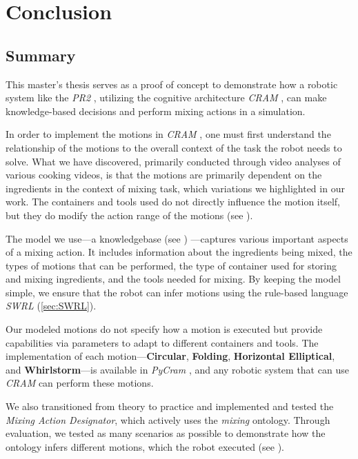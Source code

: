 \chapter{Conclusion}
\label{chap:conclusion}

\section{Summary}
This master's thesis serves as a proof of concept to demonstrate how a robotic system like the \textit{PR2} \cite{pr2}, utilizing the cognitive architecture \textit{CRAM} \cite{beetz10cram}, can make knowledge-based decisions and perform mixing actions in a simulation.

In order to implement the motions in \textit{CRAM} \cite{beetz10cram}, one must first understand the relationship of the motions to the overall context of the task the robot needs to solve. What we have discovered, primarily conducted through video analyses of various cooking videos, is that the motions are primarily dependent on the ingredients in the context of mixing task, which variations we highlighted in our work. The containers and tools used do not directly influence the motion itself, but they do modify the action range of the motions
(see ).

The model we use—a knowledgebase (see ) —captures various important aspects of a mixing action. It includes information about the ingredients being mixed, the types of motions that can be performed, the type of container used for storing and mixing ingredients, and the tools needed for mixing. By keeping the model simple, we ensure that the robot can infer motions using the rule-based language \textit{SWRL} (\ref{sec:SWRL}).

Our modeled motions do not specify how a motion is executed but provide capabilities via parameters to adapt to different containers and tools. The implementation of each motion—\textbf{Circular}, \textbf{Folding}, \textbf{Horizontal Elliptical}, and \textbf{Whirlstorm}—is available in \textit{PyCram} \cite{pycram}, and any robotic system that can use \textit{CRAM} \cite{beetz10cram} can perform these motions.

We also transitioned from theory to practice and implemented and tested the \textit{Mixing Action Designator}, 
which actively uses the \textit{mixing} ontology. Through evaluation, we tested as many scenarios as possible to demonstrate how the 
ontology infers different motions, which the robot executed (see ).

